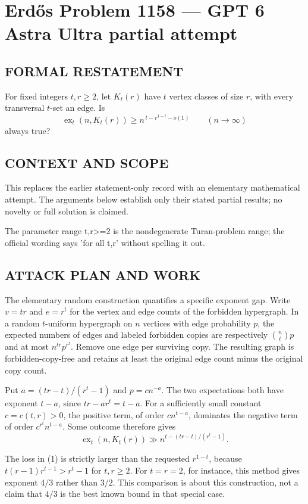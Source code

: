 \section*{Erd\H{o}s Problem 1158 --- GPT 6 Astra Ultra partial attempt}


\subsection*{FORMAL RESTATEMENT}
For fixed integers $t,r\geq2$, let $K_t(r)$ have $t$ vertex classes of size $r$, with every transversal $t$-set an edge. Is
\[
\operatorname{ex}_t(n,K_t(r))\geq n^{\,t-r^{1-t}-o(1)}
\qquad(n\to\infty)
\]
always true?

\subsection*{CONTEXT AND SCOPE}
This replaces the earlier statement-only record with an elementary mathematical attempt. The arguments below establish only their stated partial results; no novelty or full solution is claimed.

The parameter range t,r>=2 is the nondegenerate Turan-problem range; the official wording says 'for all t,r' without spelling it out.

\subsection*{ATTACK PLAN AND WORK}
The elementary random construction quantifies a specific exponent gap. Write
$v=tr$ and $e=r^t$ for the vertex and edge counts of the forbidden hypergraph.
In a random $t$-uniform hypergraph on $n$ vertices with edge probability $p$,
the expected numbers of edges and labeled forbidden copies are respectively
$\binom nt p$ and at most $n^{tr}p^{r^t}$. Remove one edge per surviving copy.
The resulting graph is forbidden-copy-free and retains at least the original
edge count minus the original copy count.

Put $a=(tr-t)/(r^t-1)$ and $p=c n^{-a}$. The two expectations both have exponent
$t-a$, since $tr-ar^t=t-a$. For a sufficiently small constant $c=c(t,r)>0$,
the positive term, of order $c n^{t-a}$, dominates the negative term of order
$c^{r^t}n^{t-a}$. Some outcome therefore gives
\[\operatorname{ex}_t(n,K_t(r))\gg n^{t-(tr-t)/(r^t-1)}.\tag{1}\]

The loss in (1) is strictly larger than the requested $r^{1-t}$, because
$t(r-1)r^{t-1}>r^t-1$ for $t,r\ge2$. For $t=r=2$, for instance, this method
gives exponent $4/3$ rather than $3/2$. This comparison is about this construction,
not a claim that $4/3$ is the best known bound in that special case.

